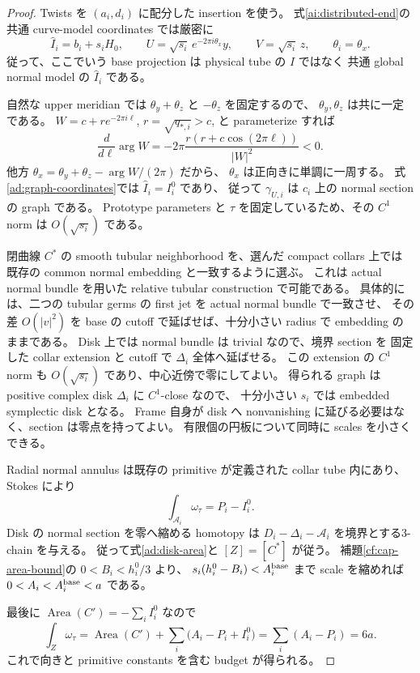 \begin{proof}
Twists を $(a_i,d_i)$ に配分した insertion を使う。
式\eqref{ai:distributed-end}の共通 curve-model coordinates では厳密に
\begin{equation}\label{ad:graph-coordinates}
 \widehat I_i=b_i+s_iH_0,\qquad
 U=\sqrt{s_i}\,e^{-2\pi i\theta_x}y,\qquad
 V=\sqrt{s_i}\,z,
 \qquad \theta_i=\theta_x.
\end{equation}
従って、ここでいう base projection は physical tube の $I$ ではなく
共通 global normal model の $\widehat I_i$ である。

自然な upper meridian では $\theta_y+\theta_z$ と $-\theta_z$ を固定するので、
$\theta_y,\theta_z$ は共に一定である。
$W=c+r e^{-2\pi i\ell}$, $r=\sqrt{q_{*,i}}>c$, と parameterize すれば
\[
 \frac{d}{d\ell}\arg W
 =-2\pi\frac{r(r+c\cos(2\pi\ell))}{|W|^2}<0.
\]
他方 $\theta_x=\theta_y+\theta_z-\arg W/(2\pi)$ だから、
$\theta_x$ は正向きに単調に一周する。
式\eqref{ad:graph-coordinates}では $\widehat I_i=I_i^0$ であり、
従って $\gamma_{U,i}$ は $c_i$ 上の normal section の graph である。
Prototype parameters と $\tau$ を固定しているため、その $C^1$ norm は $O(\sqrt{s_i})$ である。

閉曲線 $C^*$ の smooth tubular neighborhood を、選んだ compact collars 上では
既存の common normal embedding と一致するように選ぶ。
これは actual normal bundle を用いた relative tubular construction で可能である。
具体的には、二つの tubular germs の first jet を actual normal bundle で一致させ、
その差 $O(|v|^2)$ を base の cutoff で延ばせば、十分小さい radius で embedding のままである。
Disk 上では normal bundle は trivial なので、境界 section を
固定した collar extension と cutoff で $\Delta_i$ 全体へ延ばせる。
この extension の $C^1$ norm も $O(\sqrt{s_i})$ であり、中心近傍で零にしてよい。
得られる graph は positive complex disk $\Delta_i$ に $C^1$-close なので、
十分小さい $s_i$ では embedded symplectic disk となる。
Frame 自身が disk へ nonvanishing に延びる必要はなく、section は零点を持ってよい。
有限個の円板について同時に scales を小さくできる。

Radial normal annulus は既存の primitive が定義された collar tube 内にあり、Stokes により
\[
 \int_{\mathcal A_i}\omega_\tau=P_i-I_i^0.
\]
Disk の normal section を零へ縮める homotopy は
$D_i-\Delta_i-\mathcal A_i$ を境界とする3-chain を与える。
従って式\eqref{ad:disk-area}と $[Z]=[C^*]$ が従う。
補題\ref{cf:cap-area-bound}の $0<B_i<h_i^0/3$ より、
$s_i(h_i^0-B_i)<A_i^{\rm base}$ まで scale を縮めれば
$0<A_i<A_i^{\rm base}<a$ である。

最後に $\operatorname{Area}(C')=-\sum_iI_i^0$ なので
\[
 \int_Z\omega_\tau
 =\operatorname{Area}(C')+
   \sum_i\bigl(A_i-P_i+I_i^0\bigr)
 =\sum_i(A_i-P_i)=6a.
\]
これで向きと primitive constants を含む budget が得られる。
\end{proof}

